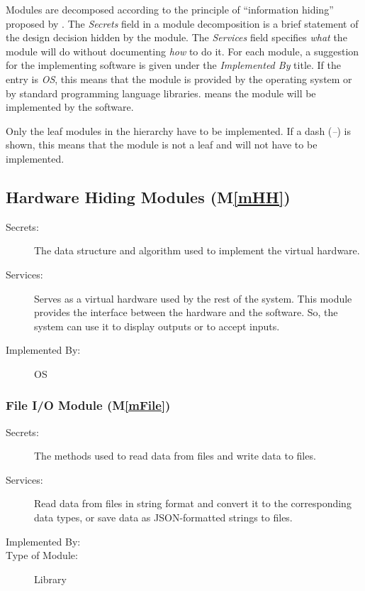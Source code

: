 \documentclass[12pt, titlepage]{article}
\newcommand{\mref}[1]{M\ref{#1}}
\begin{document}
Modules are decomposed according to the principle of ``information hiding''
proposed by \citet{ParnasEtAl1984}. The \emph{Secrets} field in a module
decomposition is a brief statement of the design decision hidden by the
module. The \emph{Services} field specifies \emph{what} the module will do
without documenting \emph{how} to do it. For each module, a suggestion for the
implementing software is given under the \emph{Implemented By} title. If the
entry is \emph{OS}, this means that the module is provided by the operating
system or by standard programming language libraries.  \emph{\progname{}} means the
module will be implemented by the \progname{} software.

Only the leaf modules in the hierarchy have to be implemented. If a dash
(\emph{--}) is shown, this means that the module is not a leaf and will not have
to be implemented.

\subsection{Hardware Hiding Modules (\mref{mHH})}

\begin{description}
\item[Secrets:]The data structure and algorithm used to implement the virtual
  hardware.
\item[Services:]Serves as a virtual hardware used by the rest of the
  system. This module provides the interface between the hardware and the
  software. So, the system can use it to display outputs or to accept inputs.
\item[Implemented By:] OS
\end{description}

\subsubsection{File I/O Module (\mref{mFile})}

\begin{description}
\item[Secrets:] The methods used to read data from files and write data to files.
\item[Services:] Read data from files in string format and convert it to the 
corresponding data types, or save data as JSON-formatted strings to files.
\item[Implemented By:] \progname{}
\item[Type of Module:] Library
\end{description}
\end{document}
